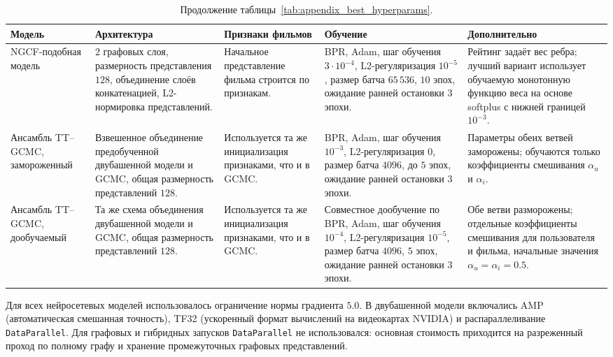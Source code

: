 \documentclass[12pt,fleqn]{article}
\begin{document}
\begin{table}[H]
\centering
\scriptsize
\renewcommand{\tabcolsep}{4pt}
\renewcommand{\arraystretch}{1.18}
\caption{ Продолжение таблицы~\ref{tab:appendix_best_hyperparams}.}
\begin{tabular}{p{}p{}p{}p{}p{}}
\toprule
Модель & Архитектура & Признаки фильмов & Обучение & Дополнительно \\
\midrule

NGCF-подобная модель
&
$2$ графовых слоя, размерность представления $128$, объединение слоёв
конкатенацией, L2-нормировка представлений.
&
Начальное представление фильма строится по признакам.
&
BPR, Adam, шаг обучения $3\cdot10^{-4}$, L2-регуляризация $10^{-5}$,
размер батча $65\,536$, $10$ эпох, ожидание ранней остановки $3$ эпохи.
&
Рейтинг задаёт вес ребра; лучший вариант использует обучаемую монотонную
функцию веса на основе softplus с нижней
границей $10^{-3}$.
\\
\addlinespace

Ансамбль TT--GCMC, замороженный
&
Взвешенное объединение предобученной двубашенной модели и GCMC, общая
размерность представлений $128$.
&
Используется та же инициализация признаками, что и в GCMC.
&
BPR, Adam, шаг обучения $10^{-3}$, L2-регуляризация $0$, размер батча $4096$,
до $5$ эпох, ожидание ранней остановки $3$ эпохи.
&
Параметры обеих ветвей заморожены; обучаются только коэффициенты смешивания
$\alpha_u$ и $\alpha_i$.
\\
\addlinespace

Ансамбль TT--GCMC, дообучаемый
&
Та же схема объединения двубашенной модели и GCMC, общая размерность
представлений $128$.
&
Используется та же инициализация признаками, что и в GCMC.
&
Совместное дообучение по BPR, Adam, шаг обучения $10^{-4}$,
L2-регуляризация $10^{-5}$, размер батча $4096$, $5$ эпох, ожидание ранней
остановки $3$ эпохи.
&
Обе ветви разморожены; отдельные коэффициенты смешивания для пользователя
и фильма, начальные значения $\alpha_u=\alpha_i=0.5$.
\\

\bottomrule
\end{tabular}
\end{table}

Для всех нейросетевых моделей использовалось ограничение нормы градиента $5.0$.
В двубашенной модели включались AMP (автоматическая смешанная точность), TF32
(ускоренный формат вычислений на видеокартах NVIDIA) и распараллеливание
\texttt{DataParallel}. Для графовых и гибридных запусков \texttt{DataParallel}
не использовался: основная стоимость приходится на разреженный проход по полному
графу и хранение промежуточных графовых представлений.
\end{document}

